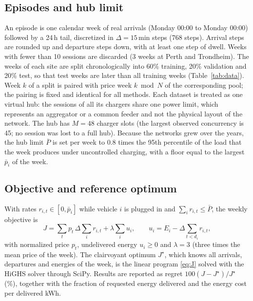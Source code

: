 \documentclass[conference]{IEEEtran}
\begin{document}
\subsection{Episodes and hub limit}
An episode is one calendar week of real arrivals (Monday 00:00 to Monday 00:00) followed by a 24\,h
tail, discretized in $\Delta=15$\,min steps (768 steps). Arrival steps are rounded up and departure
steps down, with at least one step of dwell. Weeks with fewer than 10 sessions are discarded
(3 weeks at Perth and Trondheim). The weeks of each site are split chronologically into 60\% training,
20\% validation and 20\% test, so that test weeks are later than all training weeks
(Table~\ref{tab:data}). Week $k$ of a split is paired with price week $k \bmod N$ of the
corresponding pool; the pairing is fixed and identical for all methods. Each dataset is treated as
one virtual hub: the sessions of all its chargers share one power limit, which represents an aggregator
or a common feeder and not the physical layout of the network. The hub has $M=48$ charger
slots (the largest observed concurrency is 45; no session was lost to a full hub). Because the
networks grew over the years, the hub limit $\bar P$ is set per week to $0.8$ times the 95th percentile of the load that the week
produces under uncontrolled charging, with a floor equal to the largest $\bar p_i$ of the week.

\subsection{Objective and reference optimum}
With rates $r_{i,t}\in[0,\bar p_i]$ while vehicle $i$ is plugged in and
$\sum_i r_{i,t}\le\bar P$, the weekly objective is
\begin{equation}
J=\sum_{t}p_t\,\Delta\sum_i r_{i,t}+\lambda\sum_i u_i,\qquad
u_i=E_i-\Delta\!\!\sum_{t<d_i}r_{i,t},
\label{eq:J}
\end{equation}
with normalized price $p_t$, undelivered energy $u_i\ge0$ and $\lambda=3$ (three times the mean
price of the week). The clairvoyant optimum $J^\star$, which knows all arrivals, departures and
energies of the week, is the linear program \eqref{eq:J} solved with the HiGHS solver
through SciPy. Results are reported as regret $100(J-J^\star)/J^\star$ (\%), together with the
fraction of requested energy delivered and the energy cost per delivered kWh.
\end{document}
